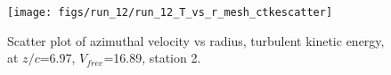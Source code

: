 \begin{figure}[H]
\centering
\texttt{[image: figs/run\_12/run\_12\_T\_vs\_r\_mesh\_ctkescatter]}
\caption{Scatter plot of azimuthal velocity vs radius, turbulent kinetic energy, at $z/c$=6.97, $V_{free}$=16.89, station 2.}
\label{fig:run_12_T_vs_r_mesh_ctkescatter}
\end{figure}


